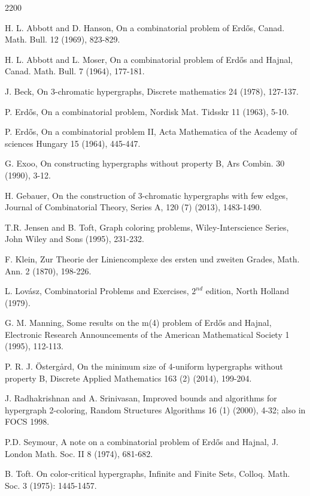 \documentclass[11pt]{article}
\begin{document}
\small
\begin{thebibliography}{2200}


H. L. Abbott and D. Hanson, 
On a combinatorial problem of Erd\H{o}s,
Canad. Math. Bull. 12 (1969), 823-829.


H. L. Abbott and L. Moser,
On a combinatorial problem of Erd\H{o}s and Hajnal,
Canad. Math. Bull. 7 (1964), 177-181.

J. Beck,
On 3-chromatic hypergraphs, Discrete mathematics 24 (1978), 127-137.

P. Erd\H{o}s,
On a combinatorial problem,
Nordisk Mat. Tidsskr 11 (1963), 5-10.


P. Erd\H{o}s,
On a combinatorial problem II,
Acta Mathematica of the Academy of sciences Hungary 15 (1964), 445-447.

G. Exoo,
On constructing hypergraphs without property B,
Ars Combin. 30 (1990), 3-12.


H. Gebauer,
On the construction of 3-chromatic hypergraphs with few edges,
Journal of Combinatorial Theory, Series A, 120 (7) (2013), 1483-1490.

T.R. Jensen and B. Toft,
Graph coloring problems,
Wiley-Interscience Series, John Wiley and Sons (1995), 231-232.


F. Klein,
Zur Theorie der Liniencomplexe des ersten und zweiten Grades,
Math. Ann. 2 (1870), 198-226.

L. Lov\'{a}sz,
Combinatorial Problems and Exercises, $2^{nd}$ edition,
North Holland (1979).

G. M. Manning,
Some results on the m(4) problem of Erd\H{o}s and Hajnal,
Electronic Research Announcements of the American Mathematical Society 1 (1995),
112-113. 

P. R. J. \"{O}sterg\r{a}rd,
On the minimum size of 4-uniform hypergraphs without property B,
Discrete Applied Mathematics 163 (2) (2014), 199-204.

J. Radhakrishnan and A. Srinivasan, 
Improved bounds and algorithms for hypergraph 2-coloring, 
Random Structures Algorithms 16 (1) (2000), 4-32; also in
FOCS 1998.


P.D. Seymour,
A note on a combinatorial problem of Erd\H{o}s and Hajnal,
J. London Math. Soc. II 8 (1974), 681-682.


B. Toft.
On color-critical hypergraphs,
Infinite and Finite Sets, Colloq. Math. Soc. 3 (1975): 1445-1457.


\end{thebibliography}
\end{document}
